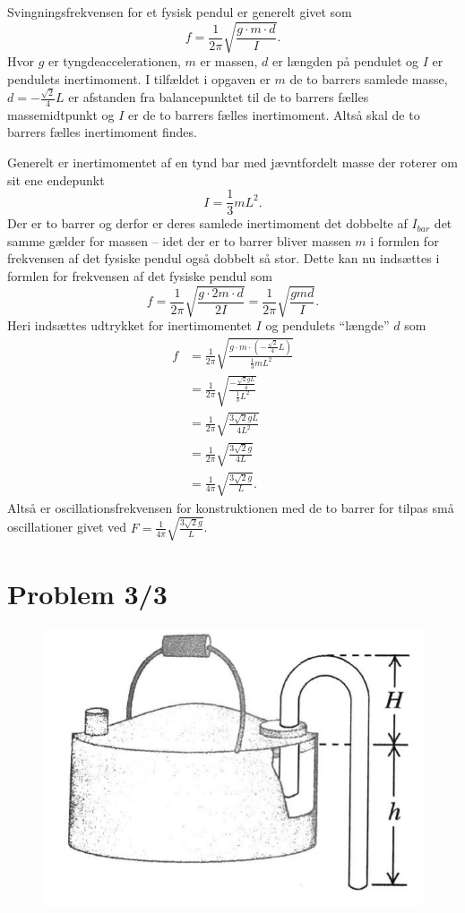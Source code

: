 \documentclass[12pt]{article}
\theoremstyle{definition}
\begin{document}
Svingningsfrekvensen for et fysisk pendul er generelt givet som
\[ 
f = \frac{1}{2\pi}\sqrt{\frac{g\cdot m\cdot d}{I}}
.\]
Hvor $g$ er tyngdeaccelerationen, $m$ er massen, $d$ er længden på pendulet og $I$ er pendulets inertimoment. I tilfældet i opgaven er $m$ de to barrers samlede masse, $d = -\frac{\sqrt{2}}{4}L$ er afstanden fra balancepunktet til de to barrers fælles massemidtpunkt og $I$ er de to barrers fælles inertimoment. Altså skal de to barrers fælles inertimoment findes.

Generelt er inertimomentet af en tynd bar med jævntfordelt masse der roterer om sit ene endepunkt
\[ 
I = \frac{1}{3}mL^2
.\]
Der er to barrer og derfor er deres samlede inertimoment det dobbelte af $I_{bar}$ det samme gælder for massen -- idet der er to barrer bliver massen $m$ i formlen for frekvensen af det fysiske pendul også dobbelt så stor. Dette kan nu indsættes i formlen for frekvensen af det fysiske pendul som
\[ 
f = \frac{1}{2\pi}\sqrt{\frac{g \cdot 2m \cdot d}{2I}} = \frac{1}{2\pi} \sqrt{\frac{gmd}{I}}
.\]
Heri indsættes udtrykket for inertimomentet $I$ og pendulets ``længde'' $d$ som
\begin{align*}
  f &= \frac{1}{2\pi}\sqrt{\frac{g\cdot m\cdot \left( -\frac{\sqrt{2}}{4}L \right)}{\frac{1}{3}mL^2}} \\
  &= \frac{1}{2\pi}\sqrt{\frac{- \frac{\sqrt{2}gL}{4}}{\frac{1}{3}L^2}} \\
  &= \frac{1}{2\pi}\sqrt{ \frac{3 \sqrt{2}gL}{4L^2} } \\
  &= \frac{1}{2\pi}\sqrt{\frac{3 \sqrt{2}g}{4L}} \\
  &= \frac{1}{4\pi} \sqrt{\frac{3 \sqrt{2}g}{L}}
.\end{align*}
Altså er oscillationsfrekvensen for konstruktionen med de to barrer for tilpas små oscillationer givet ved \underline{\underline{$F = \frac{1}{4\pi}\sqrt{\frac{3 \sqrt{2}g}{L}}$}}.



\section*{Problem 3/3}
\begin{figure} [ht]
  \centering
  \caption{}
  \includegraphics[width=0.5\linewidth]{../figures/P12_88.png}
  \label{fig:P12_88}
\end{figure}
\end{document}
